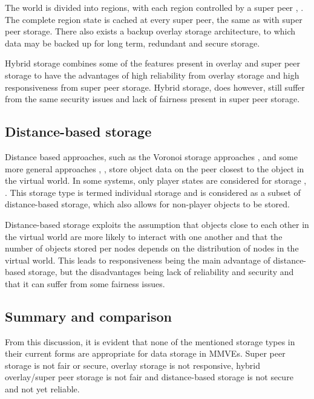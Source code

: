 \documentclass[10pt,a4paper,conference]{IEEEtran}
\begin{document}
The world is divided into regions, with each region controlled by a super peer \cite{zoned_federation}, \cite{hybrid_storage1}. The complete region
state is cached at every super peer, the same as with super peer storage. There also exists a backup overlay storage architecture, to which data may
be backed up for long term, redundant and secure storage.

Hybrid storage combines some of the features present in overlay and super peer storage to have the advantages of high reliability from overlay
storage and high responsiveness from super peer storage. Hybrid storage, does however, still suffer from the same security issues and lack of
fairness present in super peer storage.

\subsection{Distance-based storage}
\label{classic_distance_based}

Distance based approaches, such as the Voronoi storage approaches \cite{Buyukkaya_voronoi_state_management}, \cite{Hu_voronoi_IM} and some more
general approaches \cite{colyseus_distance_based}, \cite{solipsis}, store object data on the peer closest to the object in the virtual world. In some
systems, only player states are considered for storage \cite{individual_storage1}, \cite{cheat_proof_playout}. This storage type is termed individual
storage and is considered as a subset of distance-based storage, which also allows for non-player objects to be stored.

Distance-based storage exploits the assumption that objects close to each other in the virtual world are more likely to interact with one another and
that the number of objects stored per nodes depends on the distribution of nodes in the virtual world. This leads to responsiveness being the main
advantage of distance-based storage, but the disadvantages being lack of reliability and security and that it can suffer from some fairness issues.

\subsection{Summary and comparison}

From this discussion, it is evident that none of the mentioned storage types in their current forms are appropriate for data storage in MMVEs. Super
peer storage is not fair or secure, overlay storage is not responsive, hybrid overlay/super peer storage is not fair and distance-based storage is
not secure and not yet reliable.
\end{document}
